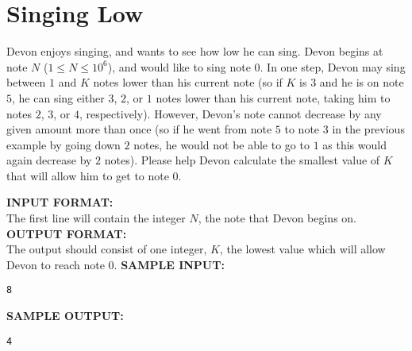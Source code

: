 \documentclass{article}
\begin{document}
\newcommand{\blank}{\vskip 3mm}
\setlength\parindent{0pt}
\renewcommand\thesection{\Alph{section}}

\setcounter{section}{2}
\section{Singing Low}

Devon enjoys singing, and wants to see how low he can sing. Devon begins at note $N$ ($1 \leq N \leq 10^6 $), and would like to sing note $0$. In one step, Devon may sing between $1$ and $K$ notes lower than his current note (so if $K$ is $3$ and he is on note $5$, he can sing either $3$, $2$, or $1$ notes lower than his current note, taking him to notes $2$, $3$, or $4$, respectively). However, Devon's note cannot decrease by any given amount more than once (so if he went from note $5$ to note $3$ in the previous example by going down $2$ notes, he would not be able to go to $1$ as this would again decrease by $2$ notes). Please help Devon calculate the smallest value of $K$ that will allow him to get to note $0$.

\blank
\textbf{INPUT FORMAT:}\\
The first line will contain the integer $ N $, the note that Devon begins on.
\blank
\textbf{OUTPUT FORMAT:}\\
The output should consist of one integer, $ K $, the lowest value which will allow Devon to reach note $ 0 $.
\blank
\textbf{SAMPLE INPUT:}
\begin{verbatim}
8
\end{verbatim}
\textbf{SAMPLE OUTPUT:}
\begin{verbatim}
4
\end{verbatim}
\end{document}
